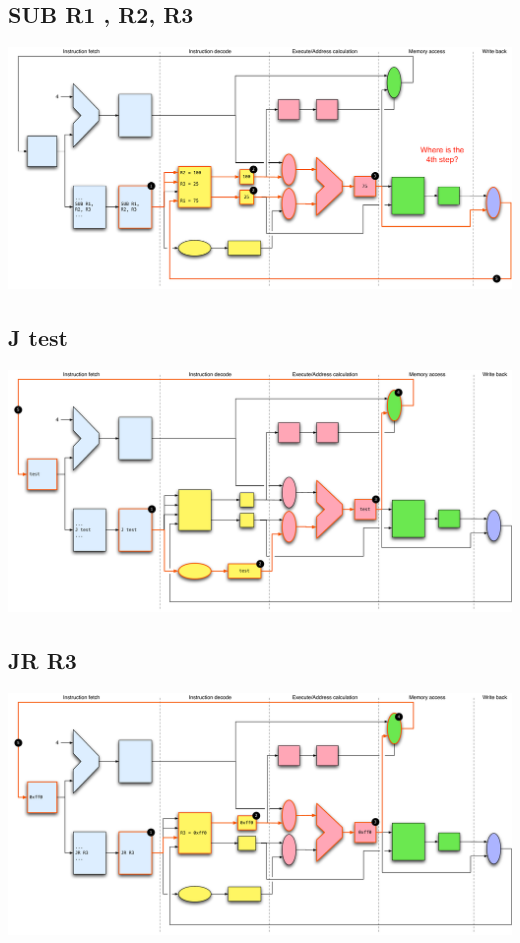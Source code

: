 \documentclass[a4paper,10pt]{article}
\begin{document}
		\subsection{SUB R1 , R2, R3}
		\begin{center}
		 			\includegraphics[width=1.1\textwidth]{./images/sub}
		\end{center}
				
			
		\subsection{J test}

		\begin{center}
		 			\includegraphics[width=1.1\textwidth]{./images/j}
		\end{center}

			
		\subsection{JR R3}
		\begin{center}
		 			\includegraphics[width=1.1\textwidth]{./images/jr}
		\end{center}
\end{document}
